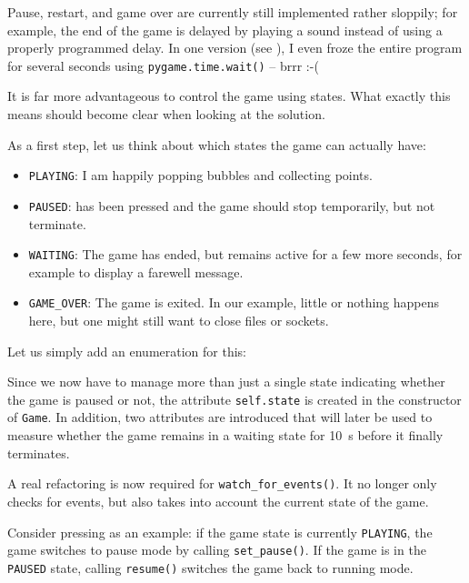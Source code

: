 Pause, restart, and game over are currently still implemented rather sloppily; for example, the end of the game is delayed by playing a sound instead of using a properly programmed delay. In one version (see ), I even froze the entire program for several seconds using \texttt{pygame.time.wait()} -- brrr :-(

It is far more advantageous to control the game using states. What exactly this means should become clear when looking at the solution.

As a first step, let us think about which states the game can actually have:

\begin{itemize}
	\item \texttt{PLAYING}: I am happily popping bubbles and collecting points.
	\item \texttt{PAUSED}:  has been pressed and the game should stop temporarily, but not terminate.
	\item \texttt{WAITING}: The game has ended, but remains active for a few more seconds, for example to display a farewell message.
	\item \texttt{GAME\_OVER}: The game is exited. In our example, little or nothing happens here, but one might still want to close files or \glspl{socket}.
\end{itemize}

Let us simply add an enumeration for this:


Since we now have to manage more than just a single state indicating whether the game is paused or not, the attribute \texttt{self.state} is created in the constructor of \texttt{Game}. In addition, two attributes are introduced that will later be used to measure whether the game remains in a waiting state for \SI{10}{s} before it finally terminates.


A real refactoring is now required for \texttt{watch\_for\_events()}. It no longer only checks for events, but also takes into account the current state of the game.

Consider pressing  as an example: if the game state is currently \texttt{PLAYING}, the game switches to pause mode by calling \texttt{set\_pause()}. If the game is in the \texttt{PAUSED} state, calling \texttt{resume()} switches the game back to running mode.

